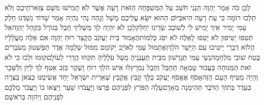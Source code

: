 \documentclass[../main/main.tex]{subfiles}
\begin{document}
\begin{multicols}{\ncols}
\pagebreak %
לָכֵן כֹּה אָמַר יַהְוֶה הִנְנִי חֹשֵׁב עַל הַמִּשְׁפָּחָה הַזֹּאת רָעָה אֲשֶׁר לֹא תָמִישׁוּ מִשָּׁם צַוְּארֹתֵיכֶם וְלֹא תֵלְכוּ רוֹמָה כִּי עֵת רָעָה הִיא\PreVerseSpace{}בַּיּוֹם הַהוּא יִשָּׂא עֲלֵיכֶם מָשָׁל וְנָהָה נְהִי נִהְיָה אָמַר שָׁדוֹד נְשַׁדֻּנוּ חֵלֶק עַמִּי יָמִיר אֵיךְ יָמִישׁ לִי לְשׁוֹבֵב שָׂדֵינוּ יְחַלֵּק\PreVerseSpace{}לָכֵן לֹא יִהְיֶה לְךָ מַשְׁלִיךְ חֶבֶל בְּגוֹרָל בִּקְהַל יַהְוֶה\PreVerseSpace{}אַל תַּטִּפוּ יַטִּיפוּן לֹא יַטִּפוּ לָאֵלֶּה לֹא יִסַּג כְּלִמּוֹת\PreVerseSpace{}הֶאָמוּר בֵּית יַעֲקֹב הֲקָצַר רוּחַ יַהְוֶה אִם אֵלֶּה מַעֲלָלָיו הֲלוֹא דְבָרַי יֵיטִיבוּ עִם הַיָּשָׁר הֹלֵךְ\PreVerseSpace{}וְאֶתְמוּל עַמִּי לְאוֹיֵב יְקוֹמֵם מִמּוּל שַׂלְמָה אֶדֶר תַּפְשִׁטוּן מֵעֹבְרִים בֶּטַח שׁוּבֵי מִלְחָמָה\PreVerseSpace{}נְשֵׁי עַמִּי תְּגָרְשׁוּן מִבֵּית תַּעֲנֻגֶיהָ מֵעַל עֹלָלֶיהָ תִּקְחוּ הֲדָרִי לְעוֹלָם\PreVerseSpace{}קוּמוּ וּלְכוּ כִּי לֹא זֹאת הַמְּנוּחָה בַּעֲבוּר טָמְאָה תְּחַבֵּל וְחֶבֶל נִמְרָץ\PreVerseSpace{}לוּ אִישׁ הֹלֵךְ רוּחַ וָשֶׁקֶר כִּזֵּב אַטִּף לְךָ לַיַּיִן וְלַשֵּׁכָר וְהָיָה מַטִּיף הָעָם הַזֶּה\PreVerseSpace{}אָסֹף אֶאֱסֹף יַעֲקֹב כֻּלָּךְ קַבֵּץ אֲקַבֵּץ שְׁאֵרִית יִשְׂרָאֵל יַחַד אֲשִׂימֶנּוּ כְּצֹאן בַּצִּרָה\SubEnd{} כְּעֵדֶר בְּתוֹךְ הַדֹּבֶר\SubEnd{} תְּהִימֶנָה מֵאָדָם\PreVerseSpace{}עָלָה הַפֹּרֵץ לִפְנֵיהֶם פָּרְצוּ וַיַּעֲבֹרוּ שַׁעַר וַיֵּצְאוּ בוֹ וַיַּעֲבֹר מַלְכָּם לִפְנֵיהֶם וַיהוָה בְּרֹאשָׁם\OpenSection{}\par

\end{multicols}
\end{document}
